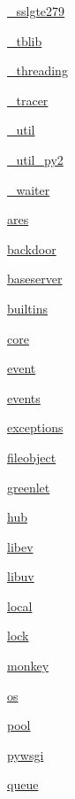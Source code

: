 \begin{DoxyCompactItemize}
 \hyperlink{namespacegevent_1_1__sslgte279}{\+\_\+sslgte279}
\item 
 \hyperlink{namespacegevent_1_1__tblib}{\+\_\+tblib}
\item 
 \hyperlink{namespacegevent_1_1__threading}{\+\_\+threading}
\item 
 \hyperlink{namespacegevent_1_1__tracer}{\+\_\+tracer}
\item 
 \hyperlink{namespacegevent_1_1__util}{\+\_\+util}
\item 
 \hyperlink{namespacegevent_1_1__util__py2}{\+\_\+util\+\_\+py2}
\item 
 \hyperlink{namespacegevent_1_1__waiter}{\+\_\+waiter}
\item 
 \hyperlink{namespacegevent_1_1ares}{ares}
\item 
 \hyperlink{namespacegevent_1_1backdoor}{backdoor}
\item 
 \hyperlink{namespacegevent_1_1baseserver}{baseserver}
\item 
 \hyperlink{namespacegevent_1_1builtins}{builtins}
\item 
 \hyperlink{namespacegevent_1_1core}{core}
\item 
 \hyperlink{namespacegevent_1_1event}{event}
\item 
 \hyperlink{namespacegevent_1_1events}{events}
\item 
 \hyperlink{namespacegevent_1_1exceptions}{exceptions}
\item 
 \hyperlink{namespacegevent_1_1fileobject}{fileobject}
\item 
 \hyperlink{namespacegevent_1_1greenlet}{greenlet}
\item 
 \hyperlink{namespacegevent_1_1hub}{hub}
\item 
 \hyperlink{namespacegevent_1_1libev}{libev}
\item 
 \hyperlink{namespacegevent_1_1libuv}{libuv}
\item 
 \hyperlink{namespacegevent_1_1local}{local}
\item 
 \hyperlink{namespacegevent_1_1lock}{lock}
\item 
 \hyperlink{namespacegevent_1_1monkey}{monkey}
\item 
 \hyperlink{namespacegevent_1_1os}{os}
\item 
 \hyperlink{namespacegevent_1_1pool}{pool}
\item 
 \hyperlink{namespacegevent_1_1pywsgi}{pywsgi}
\item 
 \hyperlink{namespacegevent_1_1queue}{queue}
\item 

\end{DoxyCompactItemize}
